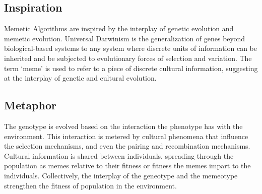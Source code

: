 \subsection{Inspiration}
Memetic Algorithms are inspired by the interplay of genetic evolution and memetic evolution. Universal Darwinism is the generalization of genes beyond biological-based systems to any system where discrete units of information can be inherited and be subjected to evolutionary forces of selection and variation. The term `meme' is used to refer to a piece of discrete cultural information, suggesting at the interplay of genetic and cultural evolution.

\subsection{Metaphor}
The genotype is evolved based on the interaction the phenotype has with the environment. This interaction is metered by cultural phenomena that influence the selection mechanisms, and even the pairing and recombination mechanisms. Cultural information is shared between individuals, spreading through the population as memes relative to their fitness or fitness the memes impart to the individuals. Collectively, the interplay of the geneotype and the memeotype strengthen the fitness of population in the environment.

